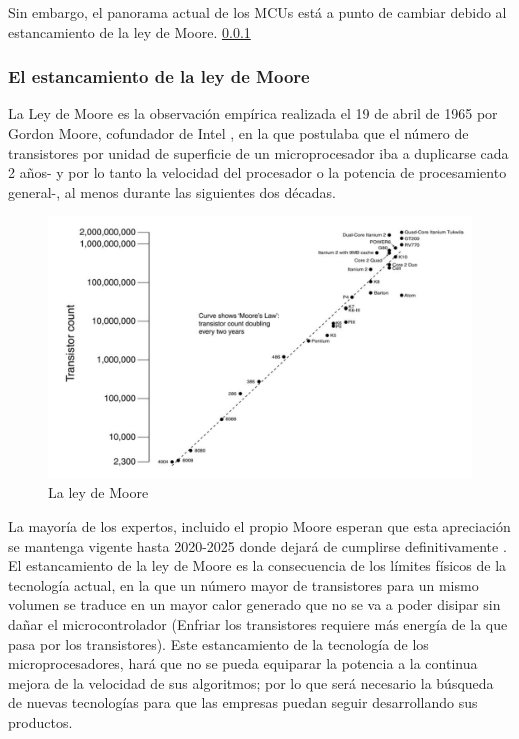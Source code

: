 Sin embargo, el panorama actual de los MCUs está a punto de cambiar debido al estancamiento de la ley de Moore. \ref{sec:Moore}\newpage

\subsubsection{El estancamiento de la ley de Moore}\label{sec:Moore}

La Ley de Moore es la observación empírica realizada el 19 de abril de 1965 por Gordon Moore, cofundador de Intel , en la que postulaba que el número de transistores por unidad de superficie de un microprocesador iba a duplicarse cada 2 años- y por lo tanto la velocidad del procesador o la potencia de procesamiento general-, al menos durante las siguientes dos décadas.\newline


\begin{figure}[H]
	\center
	\includegraphics[scale=0.5]{imagenes/Herramientas/leymoore.png}
	\caption{La ley de Moore}
	\label{fig:La ley de Moore}
\end{figure}

La mayoría de los expertos, incluido el propio Moore esperan que esta apreciación se mantenga vigente hasta 2020-2025 donde dejará de cumplirse definitivamente . El estancamiento de la ley de Moore es la consecuencia de los límites físicos de la tecnología actual, en la que un número mayor de transistores para un mismo volumen se traduce en un mayor calor generado que no se va a poder disipar sin dañar el microcontrolador (Enfriar los transistores requiere más energía de la que pasa por los transistores).\newline 
 Este estancamiento de la tecnología de los microprocesadores, hará que no se pueda equiparar la potencia a la continua mejora de la velocidad de sus algoritmos; por lo que será necesario la búsqueda de nuevas tecnologías para que las empresas puedan seguir desarrollando sus productos.\newline

